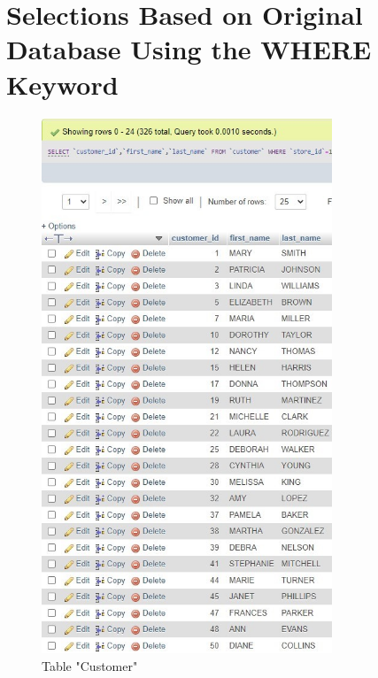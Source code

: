 \documentclass{article}
\begin{document}
\section{Selections Based on Original Database Using the WHERE Keyword} 
		\begin{figure}[H]
			\includegraphics[height = 16cm]{customer_selectwhere}
			\caption{Table "Customer"}
		\end{figure}
\end{document}
